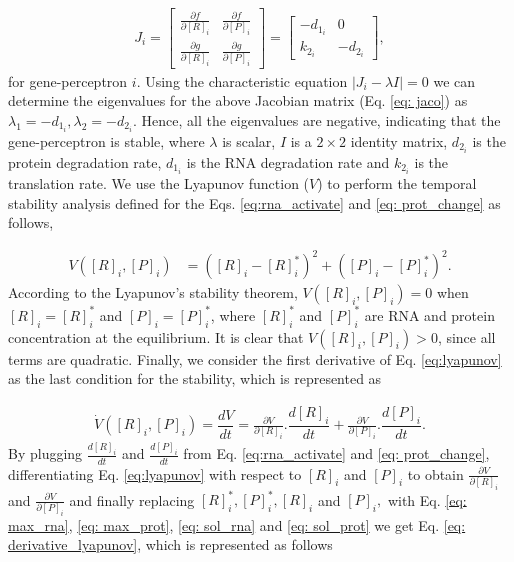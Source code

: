 \documentclass[twocolumn]{biophys-new}
\begin{document}
{{\vspace{-1em}
\begin{align}
    J_i =   \begin{bmatrix}
\frac{\partial f}{\partial [R]_i} & \frac{\partial f}{\partial [P]_i} \\
\frac{\partial g}{\partial [R]_i} & \frac{\partial g}{\partial [P]_i}
\end{bmatrix}  
=  \begin{bmatrix}
-d_{1_i} & 0 \\
k_{2_i} & -d_{2_i}  \label{eq: jaco} 
\end{bmatrix}, 
\end{align}
for gene-perceptron $i$.
Using the characteristic equation $| J_i- \lambda I | = 0$ we can determine the eigenvalues for the  above Jacobian matrix (Eq. \ref{eq: jaco}) as $\lambda_1 = -d_{1_i}, \lambda_2=-d_{2_i}$.
Hence, all the eigenvalues are negative, indicating that the gene-perceptron is stable,
where $\lambda$ is scalar, $I$ is a $2 \times 2$ identity matrix, $d_{2_i}$ is the protein degradation rate, $d_{1_i}$ is the RNA degradation rate and $k_{2_i}$ is the translation rate. 
We use the Lyapunov function ($V$) to perform the temporal stability analysis defined for the Eqs. \ref{eq:rna_activate} and \ref{eq: prot_change} as follows, 

\vspace{-1em}
\begin{align}
    V \left( [R]_i, [P]_i \right) &= \left( [R]_i - [R]_i^* \right)^2  + \left( [P]_i - [P]_i^* \right)^2 \label{eq:lyapunov}.
\end{align}
According to the Lyapunov's stability theorem, $V \left( [R]_i, [P]_i \right)=0$ when $[R]_i= [R]_i^*$ and $[P]_i= [P]_i^*$, where $[R]_i^*$ and $[P]_i^*$ are RNA and protein concentration  at the equilibrium. It is clear that $V \left( [R]_i, [P]_i \right)>0$, since all terms are quadratic. Finally, we consider the first derivative of Eq. \ref{eq:lyapunov} as the last condition for the stability, which is represented as 

\vspace{-1em}
\begin{align}
    \dot{V}([R]_i,  [P]_i)= \dfrac{dV}{dt} = \frac{\partial V}{\partial [R]_i}. \dfrac{d[R]_i}{dt} + \frac{\partial V}{\partial [P]_i}. \dfrac{d[P]_i}{dt}. \label{eq: derivative_lyapunov}
\end{align} 
By plugging $ \frac{d[R]_i}{dt}$ and $\frac{d[P]_i}{dt}$  from  Eq. \ref{eq:rna_activate} and \ref{eq: prot_change}, differentiating Eq. \ref{eq:lyapunov} with respect to $[R]_i$ and $[P]_i$ to obtain $\frac{\partial V}{\partial [R]_i}$ and $\frac{\partial V}{\partial [P]_i}$ and finally replacing $[R]_i^*, [P]_i^*, [R]_i $ and $[P]_i, $   with Eq. \ref{eq: max_rna}, \ref{eq: max_prot},  \ref{eq: sol_rna} and \ref{eq: sol_prot} we get Eq. \ref{eq: derivative_lyapunov}, which is represented as follows


}}
\end{document}
